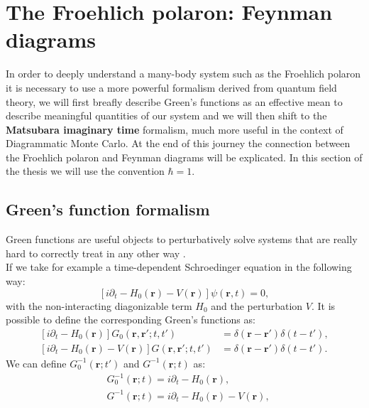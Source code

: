 \documentclass[12pt, a4paper]{report}
\numberwithin{equation}{section}
\begin{document}
\section{The Froehlich polaron: Feynman diagrams}
In order to deeply understand a many-body system such as the Froehlich polaron it is necessary to use a more powerful formalism 
derived from quantum field theory, we will first breafly describe Green's functions as an effective mean to describe meaningful quantities of 
our system and we will then shift to the \textbf{Matsubara imaginary time} formalism, much more useful in the context of Diagrammatic Monte Carlo.
At the end of this journey the connection between the Froehlich polaron and Feynman diagrams will be explicated. In this section of the thesis 
we will use the convention $\hbar=1$.
\subsection{Green's function formalism}
Green functions are useful objects to perturbatively solve systems that are really hard to correctly treat in any other way \cite{bruus2004many}.\\
If we take for example a time-dependent Schroedinger equation in the following way:
\begin{equation}
    \left[i\partial_t - H_0(\mathbf{r})-V(\mathbf{r})\right]\psi(\mathbf{r},t)=0,
    \label{Schroedinger_eq_hamiltonian}
\end{equation}
with the non-interacting diagonizable term $H_0$ and the perturbation $V$. It is possible to define the corresponding Green's functions as:
\begin{equation}
\begin{split}
    \left[i\partial_t -H_0(\mathbf{r})\right]G_0(\mathbf{r},\mathbf{r}';t,t')&=\delta(\mathbf{r}-\mathbf{r}')\delta(t-t'),\\
    \left[i\partial_t -H_0(\mathbf{r})-V(\mathbf{r})\right]G(\mathbf{r},\mathbf{r}';t,t')&=\delta(\mathbf{r}-\mathbf{r}')\delta(t-t').
\end{split}
\end{equation}
We can define $G_0^{-1}(\mathbf{r};t')$ and $G^{-1}(\mathbf{r};t)$ as:
\begin{equation}
\begin{split}
    &G_0^{-1}(\mathbf{r};t)=i\partial_t-H_0(\mathbf{r}),\\
    &G^{-1}(\mathbf{r};t)=i\partial_t-H_0(\mathbf{r})-V(\mathbf{r}),
\end{split}
\label{GF_solving_eq}
\end{equation}
\end{document}
